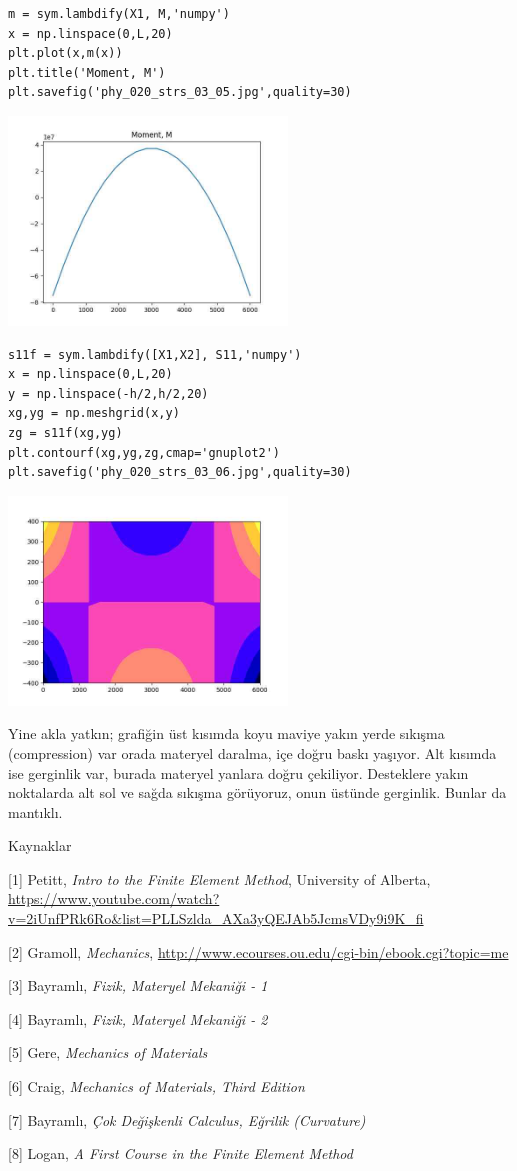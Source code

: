 \documentclass[12pt,fleqn]{article}\usepackage{../../common}
\begin{document}
\begin{verbatim}
m = sym.lambdify(X1, M,'numpy')
x = np.linspace(0,L,20)
plt.plot(x,m(x))
plt.title('Moment, M')
plt.savefig('phy_020_strs_03_05.jpg',quality=30)
\end{verbatim}

\includegraphics[width=20em]{phy_020_strs_03_05.jpg}

\begin{verbatim}
s11f = sym.lambdify([X1,X2], S11,'numpy')
x = np.linspace(0,L,20)
y = np.linspace(-h/2,h/2,20)
xg,yg = np.meshgrid(x,y)
zg = s11f(xg,yg)
plt.contourf(xg,yg,zg,cmap='gnuplot2')
plt.savefig('phy_020_strs_03_06.jpg',quality=30)
\end{verbatim}

\includegraphics[width=20em]{phy_020_strs_03_06.jpg}

Yine akla yatkın; grafiğin üst kısımda koyu maviye yakın yerde sıkışma
(compression) var orada materyel daralma, içe doğru baskı yaşıyor. Alt kısımda
ise gerginlik var, burada materyel yanlara doğru çekiliyor. Desteklere yakın
noktalarda alt sol ve sağda sıkışma görüyoruz, onun üstünde gerginlik.
Bunlar da mantıklı.

Kaynaklar

[1] Petitt, {\em Intro to the Finite Element Method}, University of Alberta,
    \url{https://www.youtube.com/watch?v=2iUnfPRk6Ro&list=PLLSzlda_AXa3yQEJAb5JcmsVDy9i9K_fi}

[2] Gramoll, {\em Mechanics},
    \url{http://www.ecourses.ou.edu/cgi-bin/ebook.cgi?topic=me}

[3] Bayramlı, {\em Fizik, Materyel Mekaniği - 1}
    
[4] Bayramlı, {\em Fizik, Materyel Mekaniği - 2}

[5] Gere, {\em Mechanics of Materials}

[6] Craig, {\em Mechanics of Materials, Third Edition}

[7] Bayramlı, {\em Çok Değişkenli Calculus, Eğrilik (Curvature)}

[8] Logan, {\em A First Course in the Finite Element Method}
  
\end{document}
